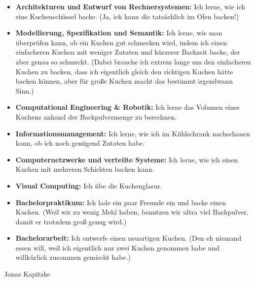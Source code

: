 {\begin{itemize}
		    backen kann, der garantiert nicht anbrennt.
		\item \textbf{Architekturen und Entwurf von Rechnersystemen:} Ich lerne,
		    wie ich eine Kuchenschüssel backe. (Ja, ich kann die tatsächlich im Ofen
		    backen!)
		\item \textbf{Modellierung, Spezifikation und Semantik:} Ich lerne, wie
		    man überprüfen kann, ob ein Kuchen gut schmecken wird, indem ich einen
		    einfacheren Kuchen mit weniger Zutaten und kürzerer Backzeit backe, der
		    aber genau so schmeckt. (Dabei brauche ich extrem lange um den
		    einfacheren Kuchen zu backen, dass ich eigentlich gleich den richtigen
		    Kuchen hätte backen können, aber für große Kuchen macht das bestimmt
		    irgendwann Sinn.)
		\item \textbf{Computational Engineering \& Robotik:} Ich lerne das
		    Volumen eines Kuchens anhand der Backpulvermenge zu berechnen.
		\item \textbf{Informationsmanagement:} Ich lerne, wie ich im Kühlschrank
		    nachschauen kann, ob ich noch genügend Zutaten habe.
		\item \textbf{Computernetzwerke und verteilte Systeme:}  Ich lerne, wie
		    ich einen Kuchen mit mehreren Schichten backen kann.
		\item \textbf{Visual Computing:} Ich übe die Kuchenglasur.
		\item \textbf{Bachelorpraktikum:} Ich lade ein paar Freunde ein und
		    backe einen Kuchen. (Weil wir zu wenig Mehl haben, benutzen wir ultra
		    viel Backpulver, damit er trotzdem groß genug wird.)
		\item \textbf{Bachelorarbeit:} Ich entwerfe einen neuartigen Kuchen.
		    (Den eh niemand essen will, weil ich eigentlich nur zwei Kuchen genommen
		    habe und willkürlich zusammen gemischt habe.)
	\end{itemize}
}
{Jonas Kapitzke}

